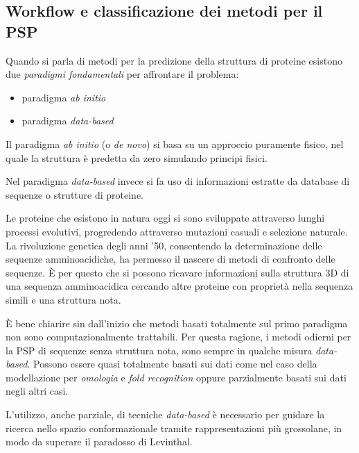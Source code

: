 \subsection{Workflow e classificazione dei metodi per il PSP} \label{sec:workflow-psp}
{
	
Quando si parla di metodi per la predizione della struttura di proteine esistono due \textit{paradigmi fondamentali} per affrontare il problema:
\begin{itemize}
	\item paradigma \textit{ab initio}
	\item paradigma \textit{data-based}
\end{itemize}

Il paradigma \textit{ab initio} (o \textit{de novo}) si basa su un approccio puramente fisico, nel quale la struttura è predetta da zero simulando principi fisici.

\par Nel paradigma \textit{data-based} invece si fa uso di informazioni estratte da database di sequenze o strutture di proteine. 

\par Le proteine che esistono in natura oggi si sono sviluppate attraverso lunghi processi evolutivi, progredendo attraverso mutazioni casuali e selezione naturale. La rivoluzione genetica degli anni '50, consentendo la determinazione delle sequenze amminoacidiche, ha permesso il nascere di metodi di confronto delle sequenze. È per questo che si possono ricavare informazioni sulla struttura 3D di una sequenza amminoacidica cercando altre proteine con proprietà nella sequenza simili e una struttura nota.\\

\par È bene chiarire sin dall'inizio che metodi basati totalmente sul primo paradigma non sono computazionalmente trattabili. Per questa ragione, i metodi odierni per la PSP di sequenze senza struttura nota, sono sempre in qualche misura \textit{data-based}. Possono essere quasi totalmente basati sui dati come nel caso della modellazione per \textit{omologia} e \textit{fold recognition} oppure parzialmente basati sui dati negli altri casi.

\par L'utilizzo, anche parziale, di tecniche \textit{data-based} è necessario per guidare la ricerca nello spazio conformazionale tramite rappresentazioni più grossolane, in modo da superare il paradosso di Levinthal.

}
